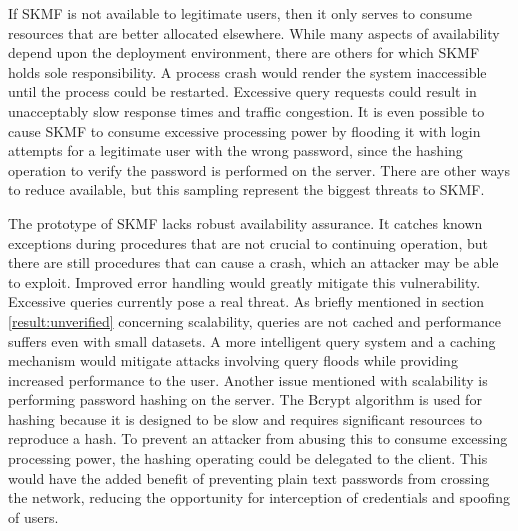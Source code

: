 If SKMF is not available to legitimate users, then it only serves to consume resources that are better allocated elsewhere. While many aspects of availability depend upon the deployment environment, there are others for which SKMF holds sole responsibility. A process crash would render the system inaccessible until the process could be restarted. Excessive query requests could result in unacceptably slow response times and traffic congestion. It is even possible to cause SKMF to consume excessive processing power by flooding it with login attempts for a legitimate user with the wrong password, since the hashing operation to verify the password is performed on the server. There are other ways to reduce available, but this sampling represent the biggest threats to SKMF.

The prototype of SKMF lacks robust availability assurance. It catches known exceptions during procedures that are not crucial to continuing operation, but there are still procedures that can cause a crash, which an attacker may be able to exploit. Improved error handling would greatly mitigate this vulnerability. Excessive queries currently pose a real threat. As briefly mentioned in section
\ref{result:unverified}
concerning scalability, queries are not cached and performance suffers even with small datasets. A more intelligent query system and a caching mechanism would mitigate attacks involving query floods while providing increased performance to the user. Another issue mentioned with scalability is performing password hashing on the server. The Bcrypt algorithm is used for hashing because it is designed to be slow and requires significant resources to reproduce a hash. To prevent an attacker from abusing this to consume excessing processing power, the hashing operating could be delegated to the client. This would have the added benefit of preventing plain text passwords from crossing the network, reducing the opportunity for interception of credentials and spoofing of users.
